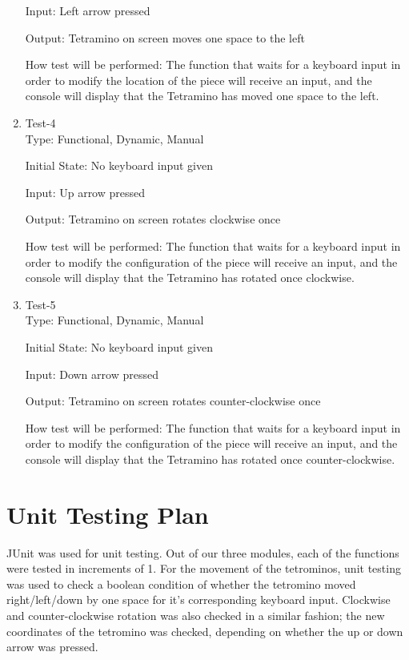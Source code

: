 \documentclass[12pt, titlepage]{article}
\begin{document}
\begin{enumerate}
Input: Left arrow pressed
					
Output: Tetramino on screen moves one space to the left
					
How test will be performed: The function that waits for a keyboard input in order to modify the location of the piece will receive an input, and the console will display that the Tetramino has moved one space to the left.

\item{Test-4\\}
Type: Functional, Dynamic, Manual
					
Initial State: No keyboard input given
					
Input: Up arrow pressed
					
Output: Tetramino on screen rotates clockwise once
					
How test will be performed: The function that waits for a keyboard input in order to modify the configuration of the piece will receive an input, and the console will display that the Tetramino has rotated once clockwise.

\item{Test-5\\}
Type: Functional, Dynamic, Manual
					
Initial State: No keyboard input given
					
Input: Down arrow pressed
					
Output: Tetramino on screen rotates counter-clockwise once
					
How test will be performed: The function that waits for a keyboard input in order to modify the configuration of the piece will receive an input, and the console will display that the Tetramino has rotated once counter-clockwise.
					
\end{enumerate}

\section{Unit Testing Plan}
JUnit was used for unit testing. Out of our three modules, each of the functions were tested in increments of 1. For the movement of the tetrominos, unit testing was used to check a boolean condition of whether the tetromino moved right/left/down by one space for it's corresponding keyboard input. Clockwise and counter-clockwise rotation was also checked in a similar fashion; the new coordinates of the tetromino was checked, depending on whether the up or down arrow was pressed.
\end{document}
